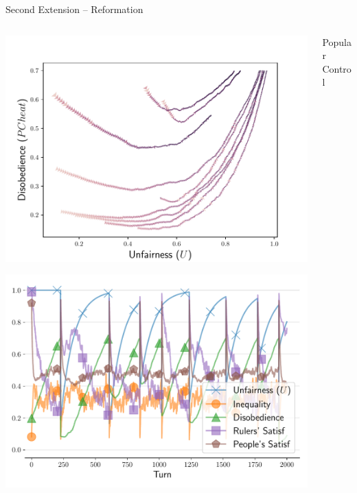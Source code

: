 \documentclass[xcolor={table}]{beamer}
\begin{document}
\begin{frame}[fragile=singleslide,t]
\begin{columns}[T]
\begin{column}{.58\textwidth}
\begin{block}{Second Extension -- Reformation}
\begin{columns}[T]
\begin{column}{.333\textwidth}
\begin{center}
\includegraphics[width=\linewidth]{img/trajext2corrupted.pdf}\label{fig:ext2phase}

\includegraphics[width=.9\linewidth]{img/timecycle.pdf}\label{fig:revcycle}
\end{center}

\end{column}
\begin{column}{.333\textwidth}



\begin{center}
Popular Control


\end{center}
\end{column}
\end{columns}
\end{block}
\end{column}
\end{columns}
\end{frame}
\end{document}
